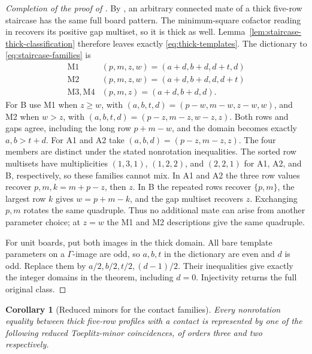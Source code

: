 \documentclass[11pt,a4paper]{amsart}
\numberwithin{equation}{section}
\theoremstyle{plain}
\newtheorem{corollary}[theorem]{Corollary}
\theoremstyle{definition}
\begin{document}
\begin{proof}[Completion of the proof of ]
By , an arbitrary connected mate of a thick
five-row staircase has the same full board pattern.  The minimum-square
cofactor reading in  recovers its positive gap multiset,
so it is thick as well.  Lemma~\ref{lem:staircase-thick-classification}
therefore leaves exactly \eqref{eq:thick-templates}.
The dictionary to \eqref{eq:staircase-families} is
\[
\begin{array}{c|c}
\mathrm{M1}&(p,m,z,w)=(a+d,b+d,d+t,d)\\
\mathrm{M2}&(p,m,z,w)=(a+d,b+d,d,d+t)\\
\mathrm{M3},\mathrm{M4}&(p,m,z)=(a+d,b+d,d).
\end{array}
\]
For B use M1 when \(z\ge w\), with
\((a,b,t,d)=(p-w,m-w,z-w,w)\), and M2 when \(w>z\), with
\((a,b,t,d)=(p-z,m-z,w-z,z)\).  Both rows and gaps agree, including the
long row \(p+m-w\), and the domain becomes exactly
\(a,b>t+d\).  For A1 and A2 take \((a,b,d)=(p-z,m-z,z)\).
The four members are distinct under the stated nonrotation inequalities.
The sorted row multisets have multiplicities \((1,3,1)\), \((1,2,2)\),
and \((2,2,1)\) for A1, A2, and B, respectively, so these families cannot
mix.  In A1 and A2 the three row values recover \(p,m,k=m+p-z\), then
\(z\).  In B the repeated rows recover \(\{p,m\}\), the largest row
\(k\) gives \(w=p+m-k\), and the gap multiset recovers \(z\).
Exchanging \(p,m\) rotates the same quadruple.  Thus no additional mate
can arise from another parameter choice; at \(z=w\) the M1 and M2
descriptions give the same quadruple.

For unit boards,  put both
images in the thick domain.  All bare template parameters on a
\(\Gamma\)-image are odd, so \(a,b,t\) in the dictionary are even
and \(d\) is odd.  Replace them by \(a/2,b/2,t/2,(d-1)/2\).
Their inequalities give exactly the integer domains in the theorem,
including \(d=0\).  Injectivity returns the full original class.
\end{proof}

\begin{corollary}[Reduced minors for the contact families]
\label{cor:staircase-contact-minors}
Every nonrotation equality between thick five-row profiles with a contact
is represented by one of the following reduced Toeplitz-minor
coincidences, of orders three and two respectively.
\end{corollary}
\end{document}
